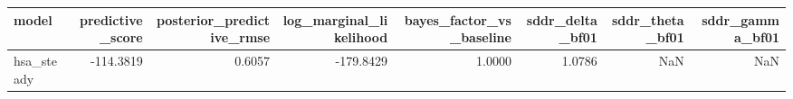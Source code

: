\begin{tabular}{lrrrrrrr}
\toprule
model & predictive\_score & posterior\_predictive\_rmse & log\_marginal\_likelihood & bayes\_factor\_vs\_baseline & sddr\_delta\_bf01 & sddr\_theta\_bf01 & sddr\_gamma\_bf01 \\
\midrule
hsa\_steady & -114.3819 & 0.6057 & -179.8429 & 1.0000 & 1.0786 & NaN & NaN \\
\bottomrule
\end{tabular}
